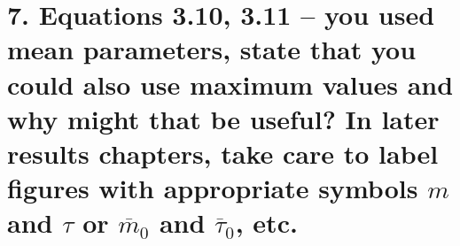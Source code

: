 \documentclass[12pt]{article}
\begin{document}
%


\section*{7. Equations 3.10, 3.11 -- you used mean parameters,
state that you could also use maximum values and why 
might that be useful?
In later results chapters, take care to label figures
with appropriate symbols $m$ and $\tau$ or 
$\overline{m}_0$ and $\overline{\tau}_0$, etc.
}


%
\end{document}
